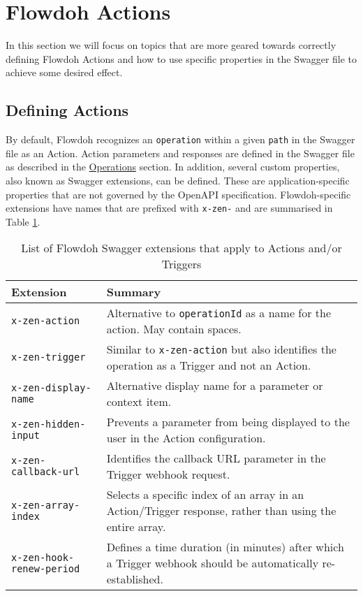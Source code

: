 \section{Flowdoh Actions}
\label{sec:actions}
In this section we will focus on topics that are more geared towards correctly defining Flowdoh Actions and how to use specific properties in the Swagger file to achieve some desired effect.
\subsection{Defining Actions}
By default, Flowdoh recognizes an \texttt{operation} within a given \texttt{path} in the Swagger file as an Action. Action parameters and responses are defined in the Swagger file as described in the \hyperref[subsubsec:operations]{Operations} section. In addition, several custom properties, also known as Swagger extensions, can be defined. These are application-specific properties that are not governed by the OpenAPI specification. Flowdoh-specific extensions have names that are prefixed with \texttt{x-zen-} and are summarised in Table \ref{table:extensions}.
\begin{table}[h!]
\centering
    \begin{tabularx}{0.9\textwidth}{ X X }
        \hline
        Extension & Summary \\
        \hline
        \texttt{x-zen-action} & Alternative to \texttt{operationId} as a name for the action. May contain spaces. \\
        \hline
        \texttt{x-zen-trigger} & Similar to \texttt{x-zen-action} but also identifies the operation as a Trigger and not an Action. \\
        \hline
        \texttt{x-zen-display-name} & Alternative display name for a parameter or context item. \\
        \hline
        \texttt{x-zen-hidden-input} & Prevents a parameter from being displayed to the user in the Action configuration. \\
        \hline
        \texttt{x-zen-callback-url} & Identifies the callback URL parameter in the Trigger webhook request. \\
        \hline
        \texttt{x-zen-array-index} & Selects a specific index of an array in an Action/Trigger response, rather than using the entire array. \\
        \hline
        \texttt{x-zen-hook-renew-period} & Defines a time duration (in minutes) after which a Trigger webhook should be automatically re-established. \\
        \hline
    \end{tabularx}
    \caption{List of Flowdoh Swagger extensions that apply to Actions and/or Triggers}
    \label{table:extensions}
\end{table}
